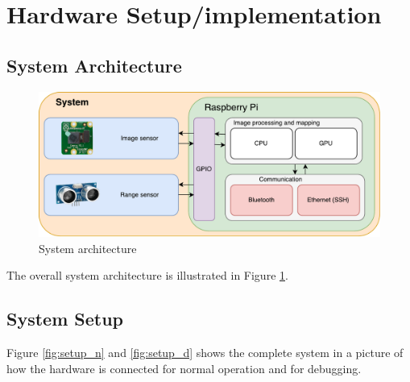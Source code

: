 \section{Hardware Setup/implementation}
\subsection{System Architecture}

\begin{figure}[h]
  \centering
  \includegraphics[width=1\textwidth]{fig/system}
  \caption{System architecture}
  \label{fig:system}
\end{figure}

The overall system architecture is illustrated in Figure \ref{fig:system}. 

\subsection{System Setup}
Figure \ref{fig:setup_n} and \ref{fig:setup_d} shows the complete system in a picture of how the hardware is connected for normal operation and for debugging.

